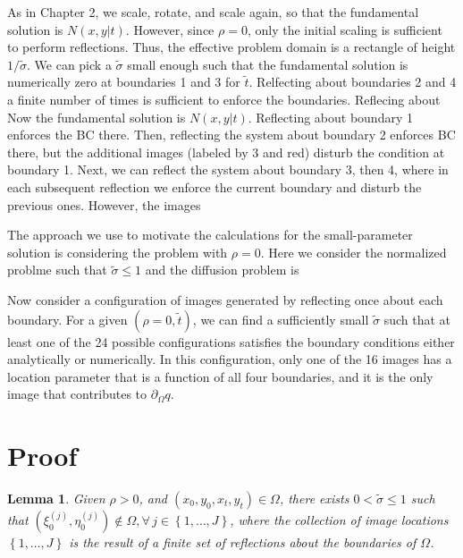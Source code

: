 \documentclass[10pt]{article}
\newtheorem{lemma}{Lemma}
\begin{document}
As in Chapter 2, we scale, rotate, and scale
again, so that the fundamental solution is $N(x,y|t)$. However, since
$\rho=0$, only the initial scaling is sufficient to perform
reflections. Thus, the effective problem domain is a rectangle of
height $1/\tilde{\sigma}$. We can pick a $\tilde{\sigma}$ small enough
such that the fundamental solution is numerically zero at boundaries 1
and 3 for $\tilde{t}$. Relfecting about boundaries 2 and 4 a finite
number of times is sufficient to enforce the boundaries. Reflecing about Now the fundamental solution is
$N(x,y|t)$. Reflecting about boundary 1 enforces the BC there. Then,
reflecting the system about boundary 2 enforces BC there, but the
additional images (labeled by 3 and red) disturb the condition at
boundary 1. Next, we can reflect the system about boundary 3, then 4,
where in each subsequent reflection we enforce the current boundary
and disturb the previous ones. However, the images

The approach we use to motivate the calculations for the
small-parameter solution is considering the problem with
$\rho=0$. Here we consider the normalized problme such that
$\tilde{\sigma} \leq 1$ and the diffusion problem is

Now consider a configuration of images generated by reflecting once
about each boundary. For a given $(\rho=0, \tilde{t})$, we can find a
sufficiently small $\tilde{\sigma}$ such that at least one of the 24
possible configurations satisfies the boundary conditions either
analytically or numerically. In this configuration, only one of the 16
images has a location parameter that is a function of all four
boundaries, and it is the only image that contributes to
$\partial_{\Omega} q$.

\section{Proof}
\begin{lemma}
  Given $\rho > 0$, and $(x_0, y_0, x_t, y_t) \in \Omega$, there
  exists $0 < \tilde{\sigma} \leq 1$ such that
  $(\xi_0^{(j)}, \eta_0^{(j)}) \notin \Omega, \forall \, j\in
  \left\{1, \ldots, J\right\}$, where the collection of image
  locations $\left\{1, \ldots, J\right\}$ is the result of a finite
  set of reflections about the boundaries of $\Omega$.
\end{lemma}
\end{document}
